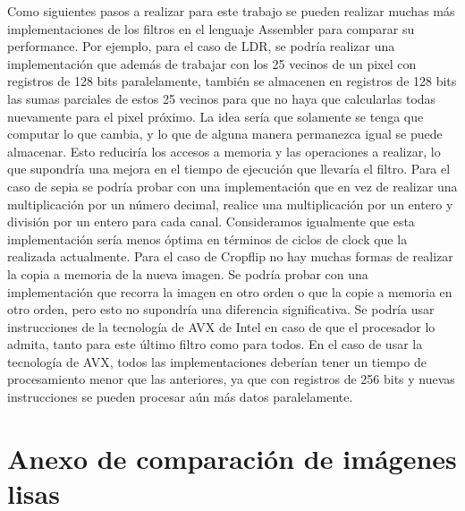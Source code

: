 \documentclass[a4paper]{article}
\begin{document}
\par
Como siguientes pasos a realizar para este trabajo se pueden realizar
muchas más implementaciones de los filtros en el lenguaje Assembler para comparar
su performance. Por ejemplo, para el caso de LDR, se podría realizar una implementación
que además de trabajar con los 25 vecinos de un pixel con registros de 128 bits paralelamente,
también se almacenen en registros de 128 bits las sumas parciales de estos 25 vecinos para que
no haya que calcularlas todas nuevamente para el pixel próximo. La idea sería que solamente se
tenga que computar lo que cambia, y lo que de alguna manera permanezca igual se puede almacenar.
Esto reduciría los accesos a memoria y las operaciones a realizar, lo que supondría una mejora en
el tiempo de ejecución que llevaría el filtro. Para el caso de sepia se podría probar con una
implementación que en vez de realizar una multiplicación por un número decimal, realice una multiplicación
por un entero y división por un entero para cada canal. Consideramos igualmente que esta implementación
sería menos óptima en términos de ciclos de clock que la realizada actualmente. Para el caso de
Cropflip no hay muchas formas de realizar la copia a memoria de la nueva imagen. Se podría probar
con una implementación que recorra la imagen en otro orden o que la copie a memoria en otro orden,
pero esto no supondría una diferencia significativa. Se podría usar instrucciones de la tecnología
de AVX de Intel en caso de que el procesador lo admita, tanto para este último filtro como para todos.
En el caso de usar la tecnología de AVX, todos las implementaciones deberían tener un tiempo de
procesamiento menor que las anteriores, ya que con registros de 256 bits y nuevas instrucciones se pueden
procesar aún más datos paralelamente.

\newpage
\section{Anexo de comparación de imágenes lisas}
\end{document}
